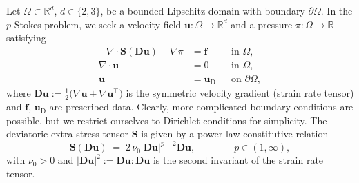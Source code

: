 \documentclass[11pt,pdflatex,sn-mathphys-num]{sn-jnl}
\theoremstyle{thmstyleone}%
\theoremstyle{thmstyletwo}%
\theoremstyle{thmstylethree}%
\newcommand{\bs}[1]{\ensuremath{\boldsymbol{#1}}}
\begin{document}
Let $\Omega\subset\mathbb{R}^{d}$, $d\in\{2,3\}$, be a bounded Lipschitz domain with boundary $\partial\Omega$.
In the $p$-Stokes problem, we seek a velocity field
$\bs{u}:\Omega\to\mathbb{R}^{d}$ and a pressure
$\pi:\Omega\to\mathbb{R}$ satisfying
\begin{subequations}
\label{eq:p-stokes-strong}
\begin{align}
-\nabla\!\cdot\!\bs{S}\!\left(\bs{D}\bs{u}\right) + \nabla\pi
   &= \bs{f}            && \text{in }\Omega,
   \label{eq:p-stokes-mom}\\
\nabla\!\cdot\!\bs{u}
   &= 0                 && \text{in }\Omega,
   \label{eq:p-stokes-mass}\\
\bs{u} &= \bs{u}_{\mathrm D} && \text{on }\partial\Omega,%
\end{align}
\end{subequations}
where
$\bs{D}\bs{u}:=\tfrac{1}{2}\bigl(\nabla\bs{u}+\nabla\bs{u}^\top\bigr)$
is the symmetric velocity gradient (strain rate tensor) and
$\bs{f}$, $\bs{u}_{\mathrm D}$ are prescribed
data. Clearly, more complicated boundary conditions are possible, but we restrict ourselves to Dirichlet conditions for simplicity.
The deviatoric extra-stress tensor $\bs{S}$ is given by
a power-law constitutive relation
\begin{equation*}
\bs{S}(\bs{D}\bs{u})\;=\;2\,\nu_0 |\bs{D}\bs{u}|^{p-2}\bs{D}\bs{u},
\qquad
\qquad p\in(1,\infty),
\end{equation*}
with $\nu_{0}>0$ and $|\bs{D}\bs{u}|^{2}:=\bs{D}\bs{u}\!:\!\bs{D}\bs{u}$ is the second invariant of the strain rate tensor.
\end{document}
